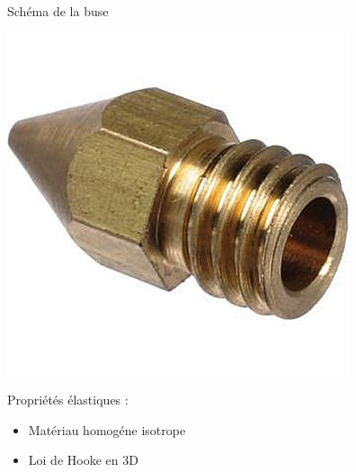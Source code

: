 \documentclass[french]{beamer}
\begin{document}
\begin{frame}{Schéma de la buse}
  \begin{minipage}{0.48\textwidth}
    \includegraphics[scale=0.3]{images/buse.png}
  \end{minipage}
  \begin{minipage}{0.48\textwidth}
    Propriétés élastiques :
    \begin{itemize}
      \item Matériau homogéne isotrope
      \item Loi de Hooke en 3D 
    \end{itemize}
  \end{minipage}
\end{frame}
\end{document}
